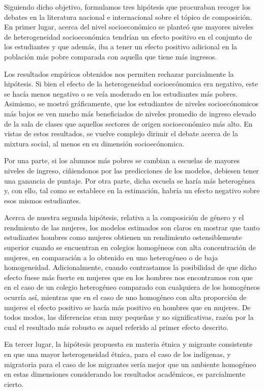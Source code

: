 \documentclass[
]{article}
\begin{document}
Siguiendo dicho objetivo, formulamos tres hipótesis que procuraban
recoger los debates en la literatura nacional e internacional sobre el
tópico de composición. En primer lugar, acerca del nivel socioeconómico
se planteó que mayores niveles de heterogeneidad socioeconómica tendrían
un efecto positivo en el conjunto de los estudiantes y que además, iba a
tener un efecto positivo adicional en la población más pobre comparada
con aquella que tiene más ingresos.

Los resultados empíricos obtenidos nos permiten rechazar parcialmente la
hipótesis. Si bien el efecto de la heterogeneidad socioecónomica era
negativo, este se hacía menos negativo o se veía moderado en los
estudiantes más pobres. Asimismo, se mostró gráficamente, que los
estudiantes de niveles socioecónomicos más bajos se ven mucho más
beneficiados de niveles promedio de ingreso elevado de la sala de clases
que aquellos sectores de origen socioeconómico más alto. En vistas de
estos resultados, se vuelve complejo dirimir el debate acerca de la
mixtura social, al menos en su dimensión socioecónomica.

Por una parte, si los alumnos más pobres se cambian a escuelas de
mayores niveles de ingreso, ciñiendonos por las predicciones de los
modelos, debiesen tener una ganancia de puntaje. Por otra parte, dicha
escuela se haría más heterogénea y, con ello, tal como se establece en
la estimación, habría un efecto negativo sobre esos mismos estudiantes.

Acerca de nuestra segunda hipótesis, relativa a la composición de género
y el rendmiento de las mujeres, los modelos estimados son claros en
mostrar que tanto estudiantes hombres como mujeres obtienen un
rendimiento ostensiblemente superior cuando se encuentran en colegios
homogéneos con alta concentración de mujeres, en comparación a lo
obtenido en uno heterogéneo o de baja homogeneidad. Adicionalmente,
cuando contrastamos la posibilidad de que dicho efecto fuese más fuerte
en mujeres que en los hombres nos encontramos con que en el caso de un
colegio heterogéneo comparado con cualquiera de los homogéneos ocurría
así, mientras que en el caso de uno homogéneo con alta proporción de
mujeres el efecto positivo se hacía más positivo en hombres que en
mujeres. De todos modos, las diferencias eran muy pequeñas y no
significativas, razón por la cual el resultado más robusto es aquel
referido al primer efecto descrito.

En tercer lugar, la hipótesis propuesta en materia étnica y migrante
consistente en que una mayor heterogeneidad étnica, para el caso de los
indígenas, y migratoria para el caso de los migrantes sería mejor que un
ambiente homogéneo en estas dimensiones considerando los resultados
académicos, es parcialmente cierto.
\end{document}
